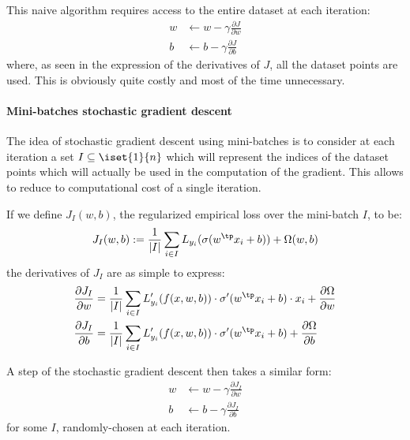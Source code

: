 \documentclass[toc, titlepaged]{../cs-classes/cs-classes}
\begin{document}
This naive algorithm requires access to the entire dataset at each iteration:
\begin{equation*}
    \begin{aligned}
        w&\longleftarrow w - \gamma\frac{\partial J}{\partial w}\\
        b&\longleftarrow b - \gamma\frac{\partial J}{\partial b}
    \end{aligned}
\end{equation*}
where, as seen in the expression of the derivatives of $J$, all the dataset points are used. This is obviously quite costly and most of the time unnecessary.

\paragraph*{Mini-batches stochastic gradient descent}
The idea of stochastic gradient descent using mini-batches is to consider at each iteration a set $I\subseteq\iset{1}{n}$ which will represent the indices of the dataset points which will actually be used in the computation of the gradient. This allows to reduce to computational cost of a single iteration.

If we define $J_I(w, b)$, the regularized empirical loss over the mini-batch $I$, to be:
\begin{equation}
    J_I(w, b) := \frac{1}{|I|}\sum_{i\in I} L_{y_i}(\sigma(w^\tp x_i + b)) + \Omega(w, b)
\end{equation}
the derivatives of $J_I$ are as simple to express:
\begin{equation*}
    \begin{aligned}
        \frac{\partial J_I}{\partial w} &= \frac{1}{|I|}\sum_{i\in I} L_{y_i}'(f(x, w, b)) \cdot \sigma'(w^\tp x_i+b)\cdot x_i + \frac{\partial\Omega}{\partial w}\\
        \frac{\partial J_I}{\partial b} &= \frac{1}{|I|}\sum_{i\in I} L_{y_i}'(f(x, w, b)) \cdot \sigma'(w^\tp x_i+b) + \frac{\partial\Omega}{\partial b}
    \end{aligned}
\end{equation*}

A step of the stochastic gradient descent then takes a similar form:
\begin{equation*}
    \begin{aligned}
        w&\longleftarrow w - \gamma\frac{\partial J_I}{\partial w}\\
        b&\longleftarrow b - \gamma\frac{\partial J_I}{\partial b}
    \end{aligned}
\end{equation*}
for some $I$, randomly-chosen at each iteration.
\end{document}
